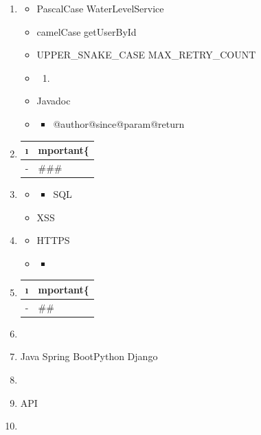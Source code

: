 \begin{enumerate}
\def\labelenumi{\arabic{enumi}.}
\item
  \important{}

  \begin{itemize}
  \item
    PascalCase WaterLevelService
  \item
    camelCase getUserById
  \item
    UPPER\_SNAKE\_CASE MAX\_RETRY\_COUNT
  \item
    \begin{enumerate}
    \def\labelenumii{\arabic{enumii}.}
        \item
      \important{}
    \end{enumerate}
  \item
    Javadoc
  \item
    \begin{itemize}
    \tightlist
    \item
      @author@since@param@return
    \end{itemize}
  \end{itemize}
\item
  \begin{longtable}[]{@{}ll@{}}
  \toprule\noalign{}
  \i & mportant\{} \\
  \midrule\noalign{}
  \endhead
  \bottomrule\noalign{}
  \endlastfoot
  - & \#\#\# \\
  \end{longtable}
\item
  \important{}

  \begin{itemize}
  \item
    \begin{itemize}
    \tightlist
    \item
      SQL
    \end{itemize}
  \item
    XSS
  \end{itemize}
\item
  \important{}

  \begin{itemize}
  \item
    HTTPS
  \item
    \begin{itemize}
    \tightlist
    \item
    \end{itemize}
  \end{itemize}
\item
  \begin{longtable}[]{@{}ll@{}}
  \toprule\noalign{}
  \i & mportant\{} \\
  \midrule\noalign{}
  \endhead
  \bottomrule\noalign{}
  \endlastfoot
  - & \#\# \\
  \end{longtable}
\item
  \important{}
\item
  \important{}Java Spring BootPython Django
\item
  \important{}
\item
  \important{}API
\item
  \important{}
\end{enumerate}

